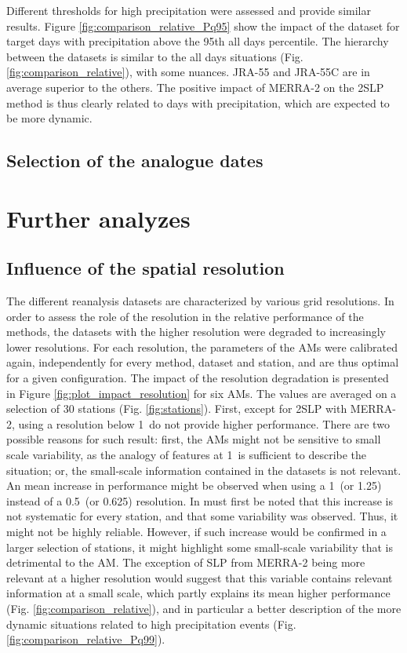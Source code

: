 \documentclass{ametsoc}
\begin{document}
Different thresholds for high precipitation were assessed and provide similar results. Figure \ref{fig:comparison_relative_Pq95} show the impact of the dataset for target days with precipitation above the 95th all days percentile. The hierarchy between the datasets is similar to the all days situations (Fig. \ref{fig:comparison_relative}), with some nuances. JRA-55 and JRA-55C are in average superior to the others. The positive impact of MERRA-2 on the 2SLP method is thus clearly related to days with precipitation, which are expected to be more dynamic.


\subsection{Selection of the analogue dates}


\section{Further analyzes}
\label{sec:analyzes}

\subsection{Influence of the spatial resolution}

The different reanalysis datasets are characterized by various grid resolutions. In order to assess the role of the resolution in the relative performance of the methods, the datasets with the higher resolution were degraded to increasingly lower resolutions. For each resolution, the parameters of the AMs were calibrated again, independently for every method, dataset and station, and are thus optimal for a given configuration. The impact of the resolution degradation is presented in Figure \ref{fig:plot_impact_resolution} for six AMs. The values are averaged on a selection of 30 stations (Fig. \ref{fig:stations}). First, except for 2SLP with MERRA-2, using a resolution below 1\degree\ do not provide higher performance. There are two possible reasons for such result: first, the AMs might not be sensitive to small scale variability, as the analogy of features at 1\degree\ is sufficient to describe the situation; or, the small-scale information contained in the datasets is not relevant. An mean increase in performance might be observed when using a 1\degree\ (or 1.25\degree) instead of a 0.5\degree\ (or 0.625\degree) resolution. In must first be noted that this increase is not systematic for every station, and that some variability was observed. Thus, it might not be highly reliable. However, if such increase would be confirmed in a larger selection of stations, it might highlight some small-scale variability that is detrimental to the AM. The exception of SLP from MERRA-2 being more relevant at a higher resolution would suggest that this variable contains relevant information at a small scale, which partly explains its mean higher performance (Fig. \ref{fig:comparison_relative}), and in particular a better description of the more dynamic situations related to high precipitation events (Fig. \ref{fig:comparison_relative_Pq99}).
\end{document}
